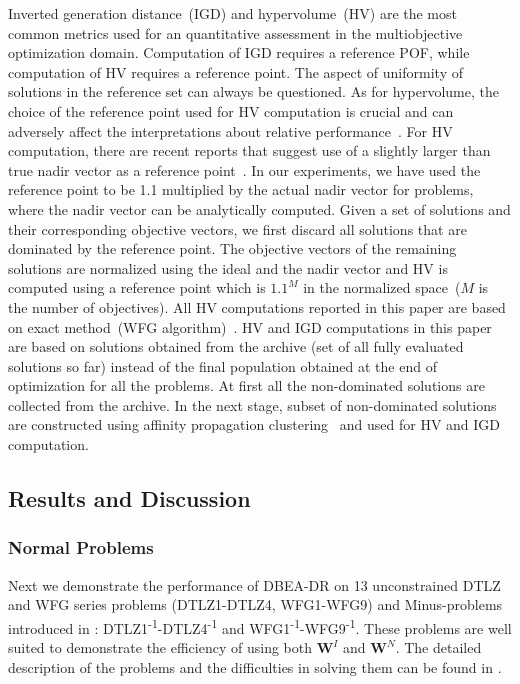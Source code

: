 \documentclass{sig-alternate}
\begin{document}
 Inverted generation distance~(IGD) and hypervolume~(HV) are the most common metrics used for an quantitative assessment in the multiobjective optimization domain. Computation of IGD requires a reference POF, while computation of HV requires a reference point. The aspect of uniformity of solutions in the reference set can always be questioned. As for hypervolume, the choice of the reference point used for HV computation is crucial and can adversely affect the interpretations about relative performance~\cite{Yuan2016many,ishibuchi2010many}. For HV computation, there are recent reports that suggest use of a slightly larger than true nadir vector as a reference point~\cite{Yuan2016many,ishibuchi2010many}. In our experiments, we have used the reference point to be 1.1 multiplied by the actual nadir vector for problems, where the nadir vector can be analytically computed. Given a set of solutions and their corresponding objective vectors, we first discard all solutions that are dominated by the reference point. The objective vectors of the remaining solutions are normalized using the ideal and the nadir vector and HV is computed using a reference point which is $1.1^M$ in the normalized space~($M$ is the number of objectives). All HV computations reported in this paper are based on exact method~(WFG algorithm)~\cite{while2012hv}. HV and IGD computations in this paper are based on solutions obtained from the archive (set of all fully evaluated solutions so far) instead of the final population obtained at the end of optimization for all the problems. At first all the non-dominated solutions are collected from the archive. In the next stage, subset of non-dominated solutions are constructed using affinity propagation clustering~\cite{apcluster2011} and used for HV and IGD computation. 

\subsection{Results and Discussion}
\label{sec:resdis}
 
\subsubsection{Normal Problems}

Next we demonstrate the performance of DBEA-DR on 13 unconstrained DTLZ and WFG series problems (DTLZ1-DTLZ4, WFG1-WFG9) and Minus-problems introduced in \cite{ishibuchi2016inverse}: DTLZ1\textsuperscript{-1}-DTLZ4\textsuperscript{-1} and WFG1\textsuperscript{-1}-WFG9\textsuperscript{-1}. These problems are well suited to demonstrate the efficiency of using both $\mathbf{W}^I$ and $\mathbf{W}^N$. The detailed description of the problems and the difficulties in solving them can be found in \cite{ishibuchi2016inverse}. 
\end{document}

